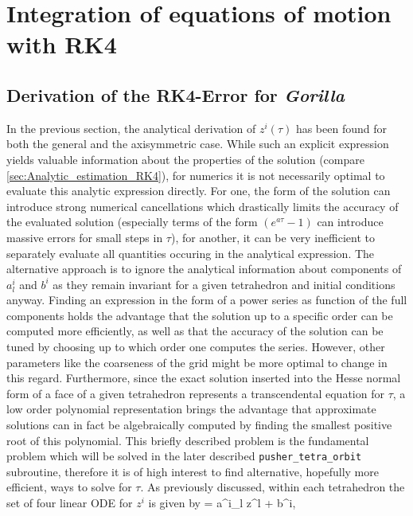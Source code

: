 \documentclass[./main.tex]{subfiles}
\begin{document}
\section{Integration of equations of motion with RK4}

\subsection{Derivation of the RK4-Error for \textit{Gorilla}}
\noindent

In the previous section, the analytical derivation of $z^i(\tau)$ has been found for both the general and the axisymmetric case. While such an explicit expression yields valuable information about the properties of the solution (compare \ref{sec:Analytic_estimation_RK4}), for numerics it is not necessarily optimal to evaluate this analytic expression directly. For one, the form of the solution can introduce strong numerical cancellations which drastically limits the accuracy of the evaluated solution (especially terms of the form $(e^{a\tau}-1)$ can introduce massive errors for small steps in $\tau$), for another, it can be very inefficient to separately evaluate all quantities occuring in the analytical expression. The alternative approach is to ignore the analytical information about components of $a^i_l$ and $b^i$ as they remain invariant for a given tetrahedron and initial conditions anyway. Finding an expression in the form of a power series as function of the full components holds the advantage that the solution up to a specific order can be computed more efficiently, as well as that the accuracy of the solution can be tuned by choosing up to which order one computes the series. However, other parameters like the coarseness of the grid might be more optimal to change in this regard. Furthermore, since the exact solution inserted into the Hesse normal form of a face of a given tetrahedron represents a transcendental equation for $\tau$, a low order polynomial representation brings the advantage that approximate solutions can in fact be algebraically computed by finding the smallest positive root of this polynomial. This briefly described problem is the fundamental problem which will be solved in the later described \texttt{pusher\_tetra\_orbit} subroutine, therefore it is of high interest to find alternative, hopefully more efficient, ways to solve for $\tau$.  
\newline
As previously discussed, within each tetrahedron the set of four linear ODE for $z^i$ is given by
\be{}
 = a^i_l z^l + b^i,
\end{document}
